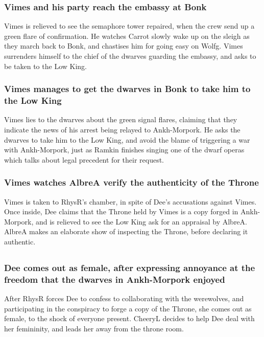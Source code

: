 \subsubsection{\Gls{Vimes} and his party reach the embassy at Bonk}
\Gls{Vimes} is relieved to see the semaphore tower repaired, when the crew send up a green flare of
confirmation. He watches \Gls{Carrot} slowly wake up on the sleigh as they march back to Bonk, and
chastises him for going easy on \Gls{Wolfg}. \Gls{Vimes} surrenders himself to the chief of the
dwarves guarding the embassy, and asks to be taken to the Low King.

\subsubsection{\Gls{Vimes} manages to get the dwarves in Bonk to take him to the Low King}
\Gls{Vimes} lies to the dwarves about the green signal flares, claiming that they indicate the
news of his arrest being relayed to Ankh-Morpork. He asks the dwarves to take him to the Low King,
and avoid the blame of triggering a war with Ankh-Morpork, just as \Gls{Ramkin} finishes singing
one of the dwarf operas which talks about legal precedent for their request.

\subsubsection{\Gls{Vimes} watches \Gls{AlbreA} verify the authenticity of the Throne}
\Gls{Vimes} is taken to \Gls{RhysR}'s chamber, in spite of \Gls{Dee}'s accusations against
\Gls{Vimes}. Once inside, \Gls{Dee} claims that the Throne held by \Gls{Vimes} is a copy forged in
Ankh-Morpork, and is relieved to see the Low King ask for an appraisal by \Gls{AlbreA}. \Gls{AlbreA}
makes an elaborate show of inspecting the Throne, before declaring it authentic.

\subsection{}
\subsubsection{\Gls{Dee} comes out as female, after expressing annoyance at the freedom that
    the dwarves in Ankh-Morpork enjoyed}
After \Gls{RhysR} forces \Gls{Dee} to confess to collaborating with the werewolves, and
participating in the conspiracy to forge a copy of the Throne, she comes out as female, to the
shock of everyone present. \Gls{CheeryL} decides to help \Gls{Dee} deal with her femininity, and
leads her away from the throne room.

